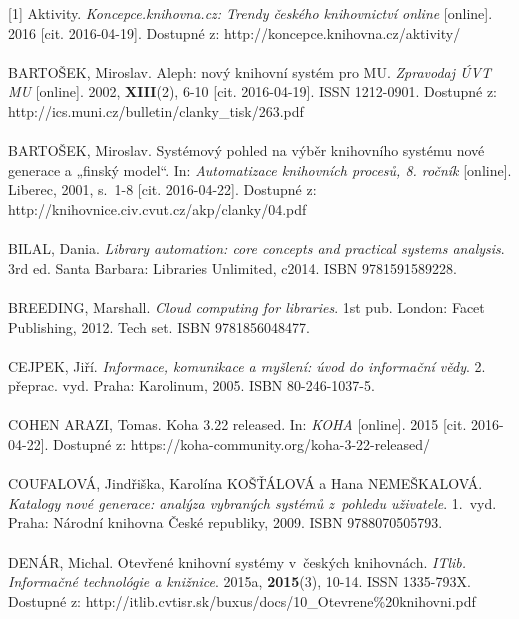 \documentclass[
	11pt, oneside, printed, final, palatino, monochrome
	microtype,
	table,   %
	lof,     %
	lot     %
]{fithesis3}
\begin{document}
{[1] Aktivity. \textit{Koncepce.knihovna.cz: Trendy českého knihovnictví online} [online]. 2016 [cit. 2016-04-19]. Dostupné z: http://koncepce.knihovna.cz/aktivity/
~\\ ~\\ \noindent
[2] BARTOŠEK, Miroslav. Aleph: nový knihovní systém pro MU. \textit{Zpravodaj ÚVT MU} [online]. 2002, 	\textbf{XIII}(2), 6-10 [cit. 2016-04-19]. ISSN 1212-0901. Dostupné z: http://ics.muni.cz/bulletin/clanky\_tisk/263.pdf
~\\ ~\\ \noindent
[3] BARTOŠEK, Miroslav. Systémový pohled na výběr knihovního systému nové generace a „finský model“. In: \textit{Automatizace knihovních procesů, 8. ročník} [online]. Liberec, 2001, s.~1-8 [cit. 2016-04-22]. Dostupné z: \\http://knihovnice.civ.cvut.cz/akp/clanky/04.pdf
~\\ ~\\ \noindent
[4] BILAL, Dania. \textit{Library automation: core concepts and practical systems analysis}. 3rd ed. Santa Barbara: Libraries Unlimited, c2014. ISBN 9781591589228.
~\\ ~\\ \noindent
[5] BREEDING, Marshall. \textit{Cloud computing for libraries}. 1st pub. London: Facet Publishing, 2012. Tech set. ISBN 9781856048477.
~\\ ~\\ \noindent
[6] CEJPEK, Jiří. \textit{Informace, komunikace a myšlení: úvod do informační vědy}. 2. přeprac. vyd. Praha: Karolinum, 2005. ISBN 80-246-1037-5.
~\\ ~\\ \noindent
[7] COHEN ARAZI, Tomas. Koha 3.22 released. In: \textit{KOHA} [online]. 2015 [cit. 2016-04-22]. Dostupné z: https://koha-community.org/koha-3-22-released/
~\\ ~\\ \noindent
[8] COUFALOVÁ, Jindřiška, Karolína KOŠŤÁLOVÁ a Hana NEMEŠKALOVÁ. \textit{Katalogy nové generace: analýza vybraných systémů z~pohledu uživatele}. 1.~vyd. Praha: Národní knihovna České republiky, 2009. ISBN 9788070505793.
~\\ ~\\ \noindent
[9] DENÁR, Michal. Otevřené knihovní systémy v~českých knihovnách. \textit{ITlib. Informačné technológie a knižnice}. 2015a, 	\textbf{2015}(3), 10-14. ISSN 1335-793X. \\Dostupné  z: http://itlib.cvtisr.sk/buxus/docs/10\_Otevrene\%20knihovni.pdf
~\\ ~\\ \noindent
}
\end{document}
